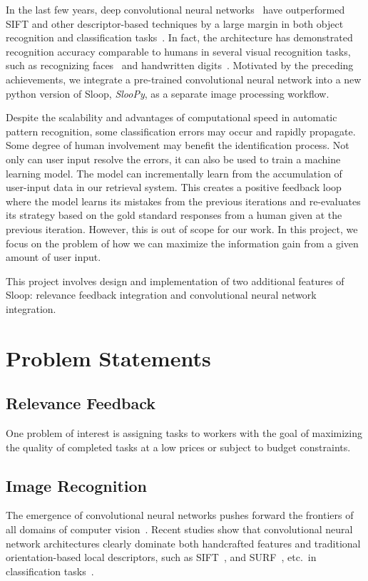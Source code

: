 In the last few years, deep convolutional neural networks~\cite{lecun95,
kriz12} have outperformed SIFT and other descriptor-based techniques by a large
margin in both object recognition and classification tasks~\cite{kriz12,
fisher14, ILSVRC15}. In fact, the architecture has demonstrated recognition
accuracy comparable to humans in several visual recognition tasks, such as
recognizing faces~\cite{deepface14} and handwritten digits~\cite{mnist13}.
Motivated by the preceding achievements, we integrate a pre-trained
convolutional neural network into a new python version of Sloop, \emph{SlooPy},
as a separate image processing workflow.

Despite the scalability and advantages of computational speed in automatic
pattern recognition, some classification errors may occur and rapidly
propagate. Some degree of human involvement may benefit the identification
process. Not only can user input resolve the errors, it can also be used to
train a machine learning model. The model can incrementally learn from the
accumulation of user-input data in our retrieval system. This creates a
positive feedback loop where the model learns its mistakes from the previous
iterations and re-evaluates its strategy based on the gold standard responses
from a human given at the previous iteration. However, this is out of scope
for our work. In this project, we focus on the problem of how we can maximize
the information gain from a given amount of user input.

This project involves design and implementation of two additional features of
Sloop: relevance feedback integration and convolutional neural network
integration.

\section{Problem Statements}

\subsection{Relevance Feedback} %
\label{sub:relevance_feedback}
One problem of interest is assigning tasks to workers with the goal of maximizing
the quality of completed tasks at a low prices or subject to budget
constraints.

\subsection{Image Recognition} %
\label{sub:image_recognition}
The emergence of convolutional neural networks pushes forward the frontiers of all
domains of computer vision~\cite{lecun95}. Recent studies show that
convolutional neural network architectures clearly dominate both handcrafted
features and traditional orientation-based local descriptors, such as
SIFT~\cite{lowe04}, and SURF~\cite{surf08}, etc.\ in classification
tasks~\cite{fisher14,kriz12,prelu15,ILSVRC15}.

